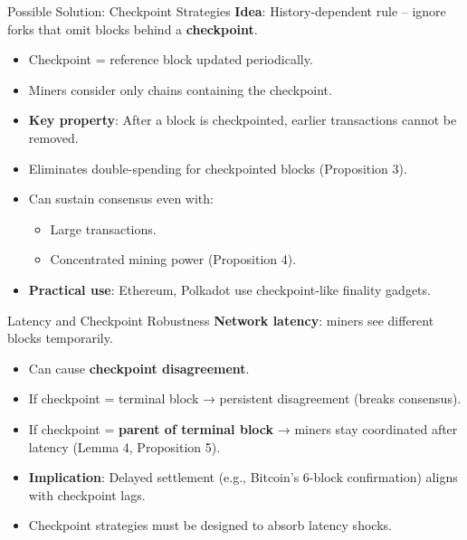 \documentclass[aspectratio=169, 12pt]{beamer}
\begin{document}
\begin{frame}{Possible Solution: Checkpoint Strategies }
    \textbf{Idea}: History-dependent rule – ignore forks that omit blocks behind a \textbf{checkpoint}.
    \begin{itemize}
        \item Checkpoint = reference block updated periodically.
        \item Miners consider only  chains containing the checkpoint.
        \item \textbf{Key property}: After a block is checkpointed, earlier transactions cannot be removed.
        \item Eliminates double-spending for checkpointed blocks (Proposition 3).
        \item Can sustain consensus even with:
        \begin{itemize}
            \item Large transactions.
            \item Concentrated mining power (Proposition 4).
        \end{itemize}
        \item \textbf{Practical use}: Ethereum, Polkadot  use checkpoint-like finality gadgets.
    \end{itemize}
\end{frame}

\begin{frame}{Latency and Checkpoint Robustness}
    \textbf{Network latency}: miners see different blocks temporarily.
    \begin{itemize}
        \item Can cause \textbf{checkpoint disagreement}.
        \item If checkpoint = terminal block → persistent disagreement (breaks consensus).
        \item If checkpoint = \textbf{parent of terminal block} → miners stay coordinated after latency (Lemma 4, Proposition 5).
        \item \textbf{Implication}: Delayed settlement (e.g., Bitcoin’s 6-block confirmation) aligns with checkpoint lags.
        \item Checkpoint strategies must be designed to absorb latency shocks.
    \end{itemize}
\end{frame}
\end{document}

